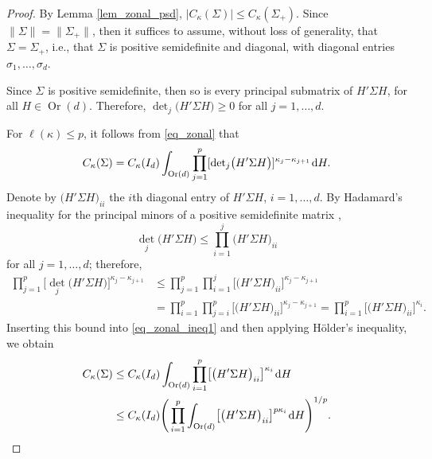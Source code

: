 \documentclass[pdftex]{sigma}
\numberwithin{equation}{section}
\def\dd {\hskip1pt\mathrm{d}}
\def\Or{\mathop{\mathrm{Or}}}
\begin{document}
\begin{proof}
By Lemma \ref{lem_zonal_psd}, $|C_\kappa(\Sigma)| \le C_\kappa(\Sigma_+)$. Since $\|\Sigma\| = \|\Sigma_+\|$, then it suffices to assume, without loss of generality, that $\Sigma = \Sigma_+$, i.e., that $\Sigma$ is positive semidefinite and diagonal, with diagonal entries $\sigma_1,\ldots,\sigma_d$.

Since $\Sigma$ is positive semidefinite, then so is every principal submatrix of $H'\Sigma H$, for all ${H \in \Or(d)}$. Therefore, ${\det}_j\bigl(H'\Sigma H\bigr) \ge 0$ for all $j=1,\ldots,d$.

For $\ell(\kappa) \le p$, it follows from \eqref{eq_zonal} that
\begin{equation}
\label{eq_zonal_ineq1}
C_\kappa(\Sigma) = C_\kappa(I_d) \int_{\Or(d)} \prod_{j=1}^p [{\det}_j\bigl(H'\Sigma H\bigr)]^{\kappa_j-\kappa_{j+1}} \dd H.
\end{equation}
Denote by $\bigl(H'\Sigma H\bigr)_{ii}$ the $i$th diagonal entry of $H'\Sigma H$, $i=1,\ldots,d$. By Hadamard's inequality for the principal minors of a positive semidefinite matrix \cite[p.~505]{Horn},
\[
{\det}_j\bigl(H'\Sigma H\bigr) \le \prod_{i=1}^j \bigl(H'\Sigma H\bigr)_{ii}
\]
for all $j=1,\ldots,d$; therefore,
\begin{align*}
\prod_{j=1}^p \bigl[{\det}_j\bigl(H'\Sigma H\bigr)\bigr]^{\kappa_j-\kappa_{j+1}} &\le \prod_{j=1}^p \prod_{i=1}^j \bigl[\bigl(H'\Sigma H\bigr)_{ii}\bigr]^{\kappa_j-\kappa_{j+1}} \\
&= \prod_{i=1}^p \prod_{j=i}^p \bigl[\bigl(H'\Sigma H\bigr)_{ii}\bigr]^{\kappa_j-\kappa_{j+1}}
= \prod_{i=1}^p \bigl[\bigl(H'\Sigma H\bigr)_{ii}\bigr]^{\kappa_i}.
\end{align*}
Inserting this bound into \eqref{eq_zonal_ineq1} and then applying H\"older's inequality, we obtain
\begin{align}
C_\kappa(\Sigma) &\le C_\kappa(I_d) \int_{\Or(d)} \prod_{i=1}^p \bigl[\bigl(H'\Sigma H\bigr)_{ii}\bigr]^{\kappa_i} \dd H \nonumber \\
&\le C_\kappa(I_d) \Bigg(\prod_{i=1}^p \int_{\Or(d)} \bigl[\bigl(H'\Sigma H\bigr)_{ii}\bigr]^{p \kappa_i} \dd H\Bigg)^{1/p}.\label{eq_zonal_Holder}
\end{align}


\end{proof}
\end{document}
